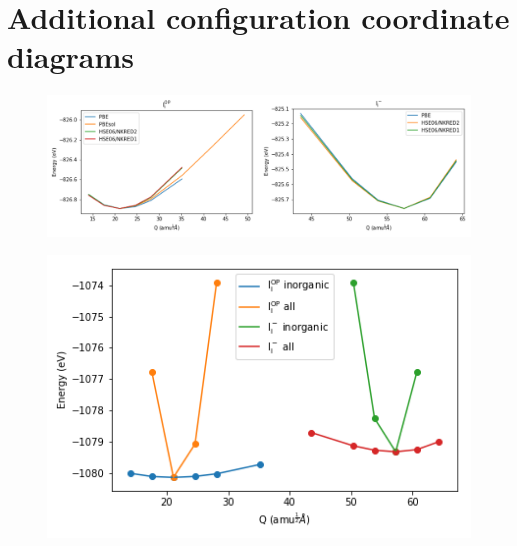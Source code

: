 \chapter{\label{app:9-configcoord}Additional configuration coordinate diagrams}

\begin{figure}[h!]   %
\centering
  \includegraphics[width=0.7\columnwidth]{figures/ap9/cc_theory.png}
  \caption[]{}
\label{schrodinger}
\end{figure}


\begin{figure}[h!]   %
\centering
  \includegraphics[width=0.7\columnwidth]{figures/ap9/organic_inorganic.png}
  \caption[]{}
\label{schrodinger}
\end{figure}